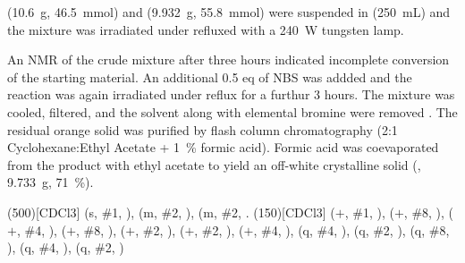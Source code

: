 \begin{experimental}[delta=(ppm),pos-number=sub,use-equal]

 (\SI{10.6}{\gram}, \SI{46.5}{\milli\mol}) and  (\SI{9.932}{\gram}, \SI{55.8}{\milli\mol}) were suspended in  (\SI{250}{\milli\L}) and the mixture was irradiated under refluxed with a \SI{240}{\watt} tungsten lamp.

An NMR of the crude mixture after three hours indicated incomplete conversion of the starting material. An additional 0.5 eq of NBS was addded and the reaction was again irradiated under reflux for a furthur 3 hours. The mixture was cooled, filtered, and the solvent along with elemental bromine were removed \invacuo. The residual orange solid was purified by flash column chromatography (2:1 Cyclohexane:Ethyl Acetate + \SI{1}{\percent} formic acid). Formic acid was coevaporated from the product with ethyl acetate to yield an off-white crystalline solid (, \SI{9.733}{\gram}, \SI{71}{\percent}).

\NMR(500)[CDCl3]  (s, \#{1}, ),  (m, \#{2}, ),  (m, \#{2}, .
%
(150)[CDCl3]  ($+$, \#{1}, ),  ($+$,
\#{8}, ),  ($+$, \#{4}, ),  ($+$, \#{8},
),  ($+$, \#{2}, ),  ($+$, \#{2},
),  ($+$, \#{4}, ),  (q, \#{4},
),  (q, \#{2}, ),  (q, \#{8}, ),
 (q, \#{4}, ),  (q, \#{2}, )
%
\end{experimental}

